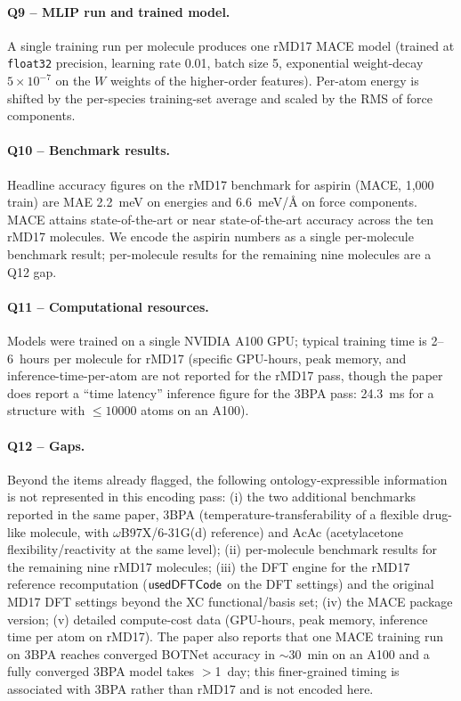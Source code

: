 \paragraph{Q9 -- MLIP run and trained model.}
A single training run per molecule produces one rMD17 MACE model
(trained at \texttt{float32} precision, learning rate 0.01, batch
size 5, exponential weight-decay $5\times10^{-7}$ on the $W$
weights of the higher-order features). Per-atom energy is
shifted by the per-species training-set average and scaled by the
RMS of force components.


\paragraph{Q10 -- Benchmark results.}
Headline accuracy figures on the rMD17 benchmark for aspirin
(MACE, 1{,}000 train) are MAE 2.2~meV on energies and
6.6~meV/\AA{} on force components. MACE attains state-of-the-art
or near state-of-the-art accuracy across the ten rMD17 molecules.
We encode the aspirin numbers as a single per-molecule benchmark
result; per-molecule results for the remaining nine molecules are a
Q12 gap.


\paragraph{Q11 -- Computational resources.}
Models were trained on a single NVIDIA A100 GPU; typical training
time is 2--6~hours per molecule for rMD17 (specific GPU-hours,
peak memory, and inference-time-per-atom are not reported for the
rMD17 pass, though the paper does report a ``time latency''
inference figure for the 3BPA pass: 24.3~ms for a structure with
$\le 10000$ atoms on an A100).


\paragraph{Q12 -- Gaps.}
Beyond the items already flagged, the following ontology-expressible
information is not represented in this encoding pass: (i) the two
additional benchmarks reported in the same paper, 3BPA
(temperature-transferability of a flexible drug-like molecule, with
$\omega$B97X/6-31G(d) reference) and AcAc (acetylacetone
flexibility/reactivity at the same level); (ii) per-molecule
benchmark results for the remaining nine rMD17 molecules; (iii) the
DFT engine for the rMD17 reference recomputation
($\mathsf{usedDFTCode}$ on the DFT settings) and the original MD17
DFT settings beyond the XC functional/basis set; (iv) the MACE
package version; (v) detailed compute-cost data (GPU-hours, peak
memory, inference time per atom on rMD17). The paper also reports
that one MACE training run on 3BPA reaches converged BOTNet
accuracy in $\sim$30~min on an A100 and a fully converged 3BPA
model takes $>$1~day; this finer-grained timing is associated
with 3BPA rather than rMD17 and is not encoded here.
